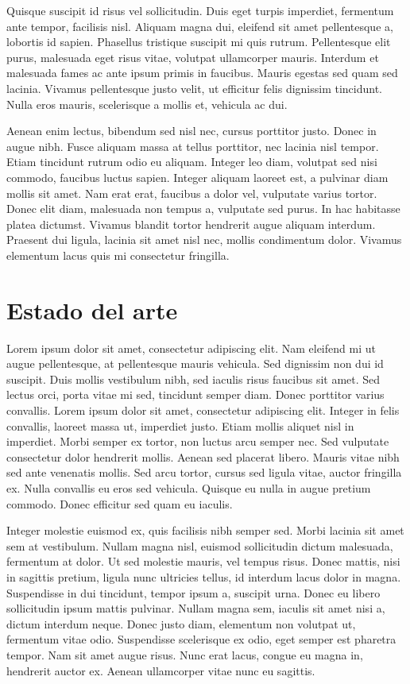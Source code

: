 \documentclass[a4paper,11pt]{article}
\begin{document}
Quisque suscipit id risus vel sollicitudin. Duis eget turpis imperdiet, fermentum ante tempor, facilisis nisl. Aliquam magna dui, eleifend sit amet pellentesque a, lobortis id sapien. Phasellus tristique suscipit mi quis rutrum. Pellentesque elit purus, malesuada eget risus vitae, volutpat ullamcorper mauris. Interdum et malesuada fames ac ante ipsum primis in faucibus. Mauris egestas sed quam sed lacinia. Vivamus pellentesque justo velit, ut efficitur felis dignissim tincidunt. Nulla eros mauris, scelerisque a mollis et, vehicula ac dui.

Aenean enim lectus, bibendum sed nisl nec, cursus porttitor justo. Donec in augue nibh. Fusce aliquam massa at tellus porttitor, nec lacinia nisl tempor. Etiam tincidunt rutrum odio eu aliquam. Integer leo diam, volutpat sed nisi commodo, faucibus luctus sapien. Integer aliquam laoreet est, a pulvinar diam mollis sit amet. Nam erat erat, faucibus a dolor vel, vulputate varius tortor. Donec elit diam, malesuada non tempus a, vulputate sed purus. In hac habitasse platea dictumst. Vivamus blandit tortor hendrerit augue aliquam interdum. Praesent dui ligula, lacinia sit amet nisl nec, mollis condimentum dolor. Vivamus elementum lacus quis mi consectetur fringilla.
\part{Estado del arte}


Lorem ipsum dolor sit amet, consectetur adipiscing elit. Nam eleifend mi ut augue pellentesque, at pellentesque mauris vehicula. Sed dignissim non dui id suscipit. Duis mollis vestibulum nibh, sed iaculis risus faucibus sit amet. Sed lectus orci, porta vitae mi sed, tincidunt semper diam. Donec porttitor varius convallis. Lorem ipsum dolor sit amet, consectetur adipiscing elit. Integer in felis convallis, laoreet massa ut, imperdiet justo. Etiam mollis aliquet nisl in imperdiet. Morbi semper ex tortor, non luctus arcu semper nec. Sed vulputate consectetur dolor hendrerit mollis. Aenean sed placerat libero. Mauris vitae nibh sed ante venenatis mollis. Sed arcu tortor, cursus sed ligula vitae, auctor fringilla ex. Nulla convallis eu eros sed vehicula. Quisque eu nulla in augue pretium commodo. Donec efficitur sed quam eu iaculis.

Integer molestie euismod ex, quis facilisis nibh semper sed. Morbi lacinia sit amet sem at vestibulum. Nullam magna nisl, euismod sollicitudin dictum malesuada, fermentum at dolor. Ut sed molestie mauris, vel tempus risus. Donec mattis, nisi in sagittis pretium, ligula nunc ultricies tellus, id interdum lacus dolor in magna. Suspendisse in dui tincidunt, tempor ipsum a, suscipit urna. Donec eu libero sollicitudin ipsum mattis pulvinar. Nullam magna sem, iaculis sit amet nisi a, dictum interdum neque. Donec justo diam, elementum non volutpat ut, fermentum vitae odio. Suspendisse scelerisque ex odio, eget semper est pharetra tempor. Nam sit amet augue risus. Nunc erat lacus, congue eu magna in, hendrerit auctor ex. Aenean ullamcorper vitae nunc eu sagittis.
\end{document}
